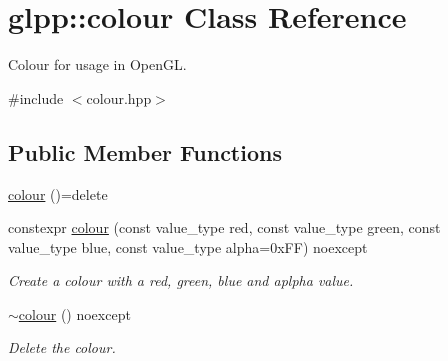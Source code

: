 \hypertarget{classglpp_1_1colour}{}\section{glpp\+:\+:colour Class Reference}
\label{classglpp_1_1colour}


Colour for usage in Open\+GL.  




{\ttfamily \#include $<$colour.\+hpp$>$}

\subsection*{Public Member Functions}
\begin{DoxyCompactItemize}
\item 
\hyperlink{classglpp_1_1colour_a2b813162a97051ad40d439a631b56fb1}{colour} ()=delete
\item 
constexpr \hyperlink{classglpp_1_1colour_a44e57aa331abf2914ce056e203be8dc8}{colour} (const value\+\_\+type red, const value\+\_\+type green, const value\+\_\+type blue, const value\+\_\+type alpha=0x\+F\+F) noexcept
\begin{DoxyCompactList}\small\item\em Create a colour with a red, green, blue and aplpha value. \end{DoxyCompactList}\item 
\hyperlink{classglpp_1_1colour_aadcae395b2f67417d30976c6adf53538}{$\sim$colour} () noexcept
\begin{DoxyCompactList}\small\item\em Delete the colour. \end{DoxyCompactList}\end{DoxyCompactItemize}
